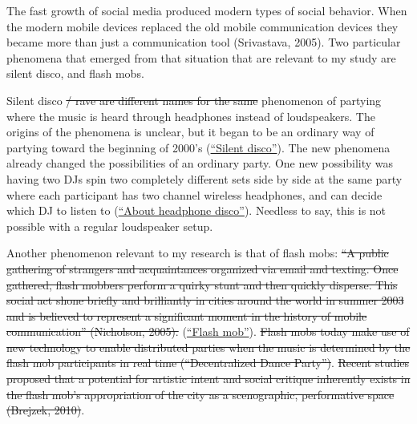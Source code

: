 
The fast growth of social media produced modern types of social behavior. When the modern mobile devices replaced the old mobile communication devices they became more than just a communication tool (Srivastava, 2005). Two particular phenomena that emerged from that situation that are relevant to my study are silent disco, and flash mobs.

Silent disco \st{/ rave are different names for the same}  phenomenon of partying where the music is heard through headphones instead of loudspeakers. The origins of the phenomena is unclear, but it began to be an ordinary way of partying toward the beginning of 2000's (\href{http://en.wikipedia.org/wiki/Silent_disco}{``Silent disco''}). The new phenomena already changed the possibilities of an ordinary party. One new possibility was having two DJs spin two completely different sets side by side at the same party where each participant has two channel wireless headphones, and can decide which DJ to listen to (\href{http://headphonedisco.com/about.php}{``About headphone disco''}). Needless to say, this is not possible with a regular loudspeaker setup.

Another phenomenon relevant to my research is that of flash mobs: \st{``A public gathering of strangers and acquaintances organized via email and texting. Once gathered, flash mobbers perform a quirky stunt and then quickly disperse. This social act shone briefly and brilliantly in cities around the world in summer 2003 and is believed to represent a significant moment in the history of mobile communication'' (Nicholson, 2005).}  (\href{http://en.wikipedia.org/wiki/Flash_mob}{``Flash mob''}).  \st{Flash mobs today make use of new technology to enable distributed parties when the music is determined by the flash mob participants in real time (``Decentralized Dance Party'')}. \st{Recent studies proposed that a potential for artistic intent and social critique inherently exists in the flash mob's appropriation of the city as a scenographic, performative space (Brejzek, 2010)}. 

